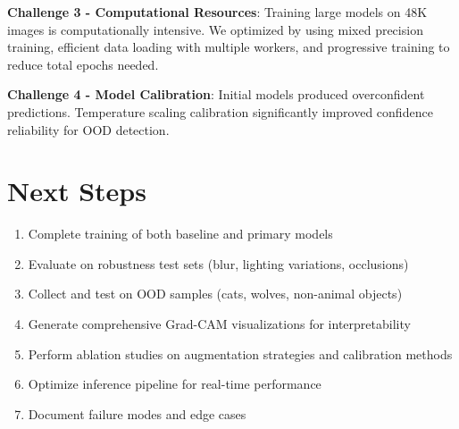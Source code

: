 \documentclass[final]{article}
\begin{document}
\textbf{Challenge 3 - Computational Resources}: Training large models on 48K images is computationally intensive. We optimized by using mixed precision training, efficient data loading with multiple workers, and progressive training to reduce total epochs needed.

\textbf{Challenge 4 - Model Calibration}: Initial models produced overconfident predictions. Temperature scaling calibration significantly improved confidence reliability for OOD detection.

\section*{Next Steps}

\begin{enumerate}
    \item Complete training of both baseline and primary models
    \item Evaluate on robustness test sets (blur, lighting variations, occlusions)
    \item Collect and test on OOD samples (cats, wolves, non-animal objects)
    \item Generate comprehensive Grad-CAM visualizations for interpretability
    \item Perform ablation studies on augmentation strategies and calibration methods
    \item Optimize inference pipeline for real-time performance
    \item Document failure modes and edge cases
\end{enumerate}
\end{document}
